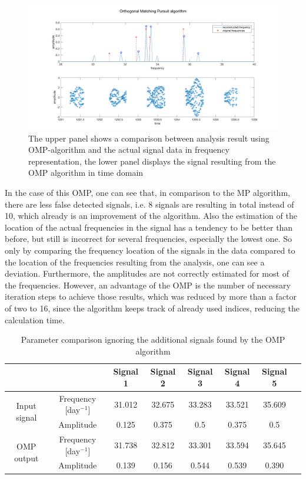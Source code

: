 \begin{figure}[H]
	\centering
		\includegraphics[width=\textwidth]{images/omp}
		\caption{The upper panel shows a comparison between analysis result using OMP-algorithm and the actual signal data in frequency representation, the lower panel displays the signal resulting from the OMP algorithm in time domain}
		\label{fig:omp}
\end{figure}

In the case of this OMP, one can see that, in comparison to the MP algorithm, there are less false detected signals, i.e. 8 signals are resulting in total instead of 10, which already is an improvement of the algorithm. Also the estimation of the location of the actual frequencies in the signal has a tendency to be better than before, but still is incorrect for several frequencies, especially the lowest one. So only by comparing the frequency location of the signals in the data compared to the location of the frequencies resulting from the analysis, one can see a deviation. Furthermore, the amplitudes are not correctly estimated for most of the frequencies. However, an advantage of the OMP is the number of necessary iteration steps to achieve those results, which was reduced by more than a factor of two to 16, since the algorithm keeps track of already used indices, reducing the calculation time.

\begin{table}[H]
\centering
\begin{tabular}{ | c| c| c| c| c| c|c|c| }
\hline
	&   & Signal 1 & Signal 2 & Signal 3 & Signal 4 & Signal 5 \\ \hline
\multirow{2}{3cm}{Input signal} & Frequency [day$^{-1}$] & 31.012 & 32.675 & 33.283 & 33.521 & 35.609 \\ \cline{2-7}
 & Amplitude & 0.125 & 0.375 & 0.5 & 0.375 & 0.5 \\ \hline

\multirow{2}{3cm}{OMP output} & Frequency [day$^{-1}$] & 31.738  & 32.812 & 33.301 & 33.594  & 35.645  \\ \cline{2-7}
 & Amplitude & 0.139 & 0.156 & 0.544  & 0.539  & 0.390 \\ \hline

\end{tabular}
\caption{Parameter comparison ignoring the additional signals found by the OMP algorithm}
\label{tab:omp}
\end{table}


